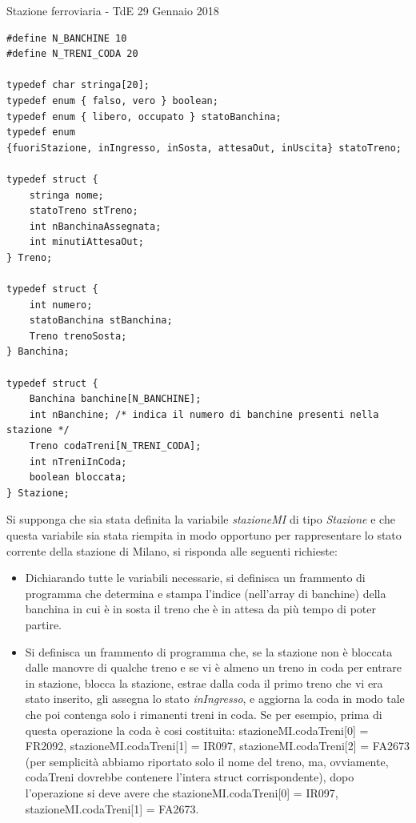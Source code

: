 \documentclass[format=169, 10pt]{beamer}
\begin{document}
\begin{frame}{Stazione ferroviaria - TdE 29 Gennaio 2018}
\begin{lstlisting}[style=CStyle, basicstyle=\small]
#define N_BANCHINE 10
#define N_TRENI_CODA 20

typedef char stringa[20];
typedef enum { falso, vero } boolean;
typedef enum { libero, occupato } statoBanchina;
typedef enum 
{fuoriStazione, inIngresso, inSosta, attesaOut, inUscita} statoTreno;

typedef struct {
    stringa nome;
    statoTreno stTreno;
    int nBanchinaAssegnata;
    int minutiAttesaOut;
} Treno;

typedef struct {
    int numero;
    statoBanchina stBanchina;
    Treno trenoSosta;
} Banchina;

typedef struct {
    Banchina banchine[N_BANCHINE];
    int nBanchine; /* indica il numero di banchine presenti nella stazione */
    Treno codaTreni[N_TRENI_CODA];
    int nTreniInCoda;
    boolean bloccata;
} Stazione;
\end{lstlisting}

Si supponga che sia stata definita la variabile \emph{stazioneMI} di tipo \emph{Stazione} e che questa variabile sia stata riempita in modo opportuno per rappresentare lo stato corrente della stazione di Milano, si risponda alle seguenti richieste:
\begin{itemize}
\item Dichiarando tutte le variabili necessarie, si definisca un frammento di programma che determina e stampa l'indice (nell’array di banchine) della banchina in cui è in sosta il treno che è in attesa da più tempo di poter partire.
\item Si definisca un frammento di programma che, se la stazione non è bloccata dalle manovre di qualche treno e se vi è almeno un treno in coda per entrare in stazione, blocca la stazione, estrae dalla coda il primo treno che vi era stato inserito, gli assegna lo stato \emph{inIngresso}, e aggiorna la coda in modo tale che poi contenga solo i rimanenti treni in coda. Se per esempio, prima di questa operazione la coda è cosi costituita: stazioneMI.codaTreni[0] = FR2092, stazioneMI.codaTreni[1] = IR097, stazioneMI.codaTreni[2] = FA2673 (per semplicità abbiamo riportato solo il nome del treno, ma, ovviamente, codaTreni dovrebbe contenere l’intera struct corrispondente), dopo l’operazione si deve avere che stazioneMI.codaTreni[0] = IR097, stazioneMI.codaTreni[1] = FA2673.
\end{itemize}
\end{frame}
\end{document}
